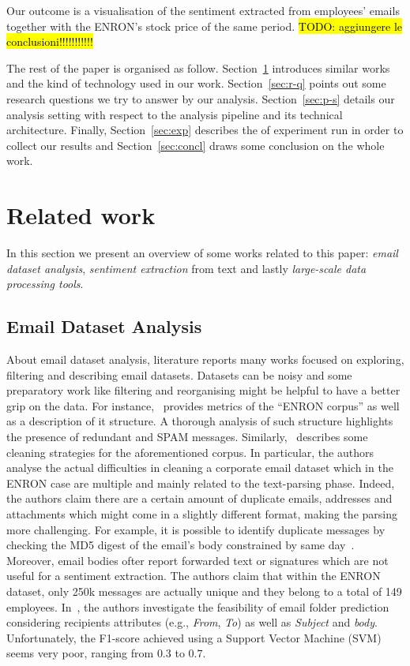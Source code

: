 \documentclass{vldb}
\newcommand{\hlc}[2][lightcyan]{{\sethlcolor{#1}\hl{#2}}}
\begin{document}
Our outcome is a visualisation of the sentiment extracted from employees' emails together with the ENRON's stock price of the same period.
\hlc{TODO: aggiungere le conclusioni!!!!!!!!!!!}

The rest of the paper is organised as follow.
Section~\ref{sec:r-w} introduces similar works and the kind of technology used in our work.
Section~\ref{sec:r-q} points out some research questions we try to answer by our analysis.
Section~\ref{sec:p-s} details our analysis setting with respect to the analysis pipeline and its technical architecture. 
Finally, Section~\ref{sec:exp} describes the of experiment run in order to collect our results and Section~\ref{sec:concl} draws some conclusion on the whole work.



\section{Related work}
\label{sec:r-w}
In this section we present an overview of some works related to this paper:
\textit{email dataset analysis}, \textit{sentiment extraction} from text and lastly \textit{large-scale data processing tools}.

\subsection{Email Dataset Analysis}
\label{sub-sec:email-dataset-analysis}
About email dataset analysis, literature reports many works focused on exploring, filtering and describing email datasets.
Datasets can be noisy and some preparatory work like filtering and reorganising might be helpful to have a better grip on the data.
For instance,~\cite{klimt2004introducing} provides metrics of the ``ENRON corpus'' as well as a description of it structure.
A thorough analysis of such structure highlights the presence of redundant and SPAM messages.
Similarly,~\cite{zhou2007strategies} describes some cleaning strategies for the aforementioned corpus.
In particular, the authors analyse the actual difficulties in cleaning a corporate email dataset which in the ENRON case are multiple and mainly related to the text-parsing phase.
Indeed, the authors claim there are a certain amount of duplicate emails, addresses and attachments which might come in a slightly different format, making the parsing more challenging.
For example, it is possible to identify duplicate messages by checking the MD5 digest of the email's body constrained by same day~\cite{corrada2004enron}.
Moreover, email bodies ofter report forwarded text or signatures which are not useful for a sentiment extraction.
The authors claim that within the ENRON dataset, only 250k messages are actually unique and they belong to a total of 149 employees.
In~\cite{klimt2004enron}, the authors investigate the feasibility of email folder prediction considering recipients attributes (e.g., \textit{From}, \textit{To}) as well as \textit{Subject} and \textit{body}.
Unfortunately, the F1-score achieved using a Support Vector Machine (SVM) seems very poor, ranging from $0.3$ to $0.7$. 
\end{document}
